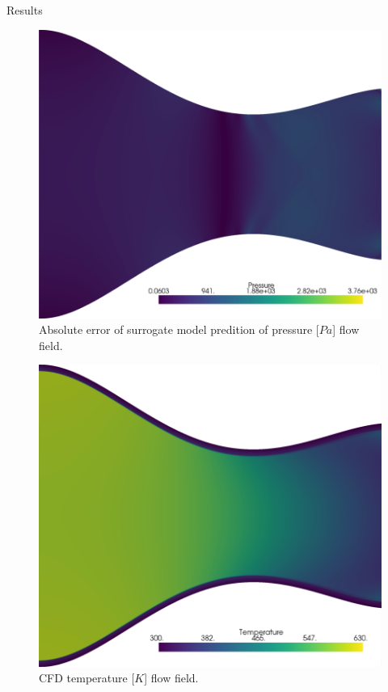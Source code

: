 \begin{frame}{Results}
\begin{figure}
\hypertarget{fig:error_pressure}{%
\centering
\includegraphics{figures/Pressure_field_error.png}
\caption{Absolute error of surrogate model predition of pressure
{[}\(Pa\){]} flow field.}\label{fig:error_pressure}
}
\end{figure}

\begin{figure}
\hypertarget{fig:cfd_temperature}{%
\centering
\includegraphics{figures/Temperature_field_cfd.png}
\caption{CFD temperature {[}\(K\){]} flow
field.}\label{fig:cfd_temperature}
}
\end{figure}


\end{frame}
